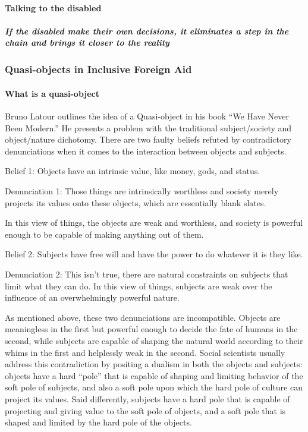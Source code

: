 \documentclass{lps}
\begin{document}
\paragraph{Talking to the disabled}

\subparagraph{If the disabled make their own decisions, it eliminates a step
in the chain and brings it closer to the reality}

\subsubsection{Quasi-objects in Inclusive Foreign Aid}

\paragraph{What is a quasi-object}

Bruno Latour outlines the idea of a Quasi-object in his book ``We Have Never
Been Modern.'' He presents a problem with the traditional subject/society and
object/nature dichotomy. There are two faulty beliefs refuted by contradictory
denunciations when it comes to the interaction between objects and subjects. 

Belief 1: Objects have an intrinsic value, like money, gods, and status. 

Denunciation 1: Those things are intrinsically worthless and society merely
projects its values onto these objects, which are essentially blank slates.

In this view of things, the objects are weak and worthless, and society is
powerful enough to be capable of making anything out of them.

Belief 2: Subjects have free will and have the power to do whatever it is they
like.

Denunciation 2: This isn't true, there are natural constraints on subjects
that limit what they can do.  In this view of things, subjects are weak over
the influence of an overwhelmingly powerful nature.

As mentioned above, these two denunciations are incompatible. Objects are
meaningless in the first but powerful enough to decide the fate of humans in
the second, while subjects are capable of shaping the natural world according
to their whims in the first and helplessly weak in the second. Social
scientists usually address this contradiction by positing a dualism in both
the objects and subjects: objects have a hard ``pole'' that is capable of
shaping and limiting behavior of the soft pole of subjects, and also a soft
pole upon which the hard pole of culture can project its values. Said
differently, subjects have a hard pole that is capable of projecting and
giving value to the soft pole of objects, and a soft pole that is shaped and
limited by the hard pole of the objects.
\end{document}

